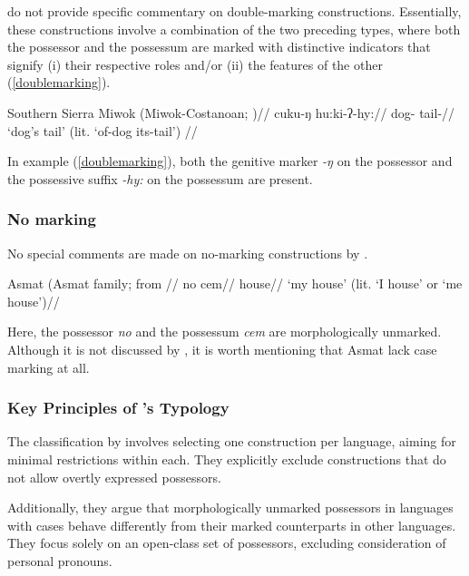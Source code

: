 \cite{nichols_locus_2013} do not provide specific commentary on double-marking constructions. Essentially, these constructions involve a combination of the two preceding types, where both the possessor and the possessum are marked with distinctive indicators that signify (i) their respective roles and/or (ii) the features of the other (\ref{doublemarking}).

\ex
\label{doublemarking}
\begingl
\glpreamble Southern Sierra Miwok (Miwok-Costanoan; \citealt[133]{Broadbent-1964})//
\gla cuku-ŋ hu:ki-ʔ-hy://
\glb dog-\Gen{} tail-\Tsg//
\glft `dog's tail’ (lit. `of-dog its-tail’) //
\endgl
\xe

In example (\ref{doublemarking}), both the genitive marker \textit{-ŋ} on the possessor and the possessive suffix \textit{-hy:} on the possessum are present.

\subsubsection{No marking}

No special comments are made on no-marking constructions by \cite{nichols_locus_2013}.

\ex
\begingl
\glpreamble Asmat (Asmat family; \citealt[136, 133]{Voorhoeve-1965b} from \citealt{nichols_locus_2013}//
\gla no cem//
\glb \Fsg{} house//
\glft `my house' (lit. `I house' or `me house')//
\endgl
\xe

Here, the possessor \textit{no} and the possessum \textit{cem} are morphologically unmarked. Although it is not discussed by \cite{nichols_locus_2013}, it is worth mentioning that Asmat lack case marking at all. 

\subsubsection{Key Principles of \citeauthor{nichols_locus_2013}'s \citeyear{nichols_locus_2013} Typology}

The classification by \cite{nichols_locus_2013} involves selecting one construction per language, aiming for minimal restrictions within each. They explicitly exclude constructions that do not allow overtly expressed possessors.

Additionally, they argue that morphologically unmarked possessors in languages with cases behave differently from their marked counterparts in other languages. They focus solely on an open-class set of possessors, excluding consideration of personal pronouns.

